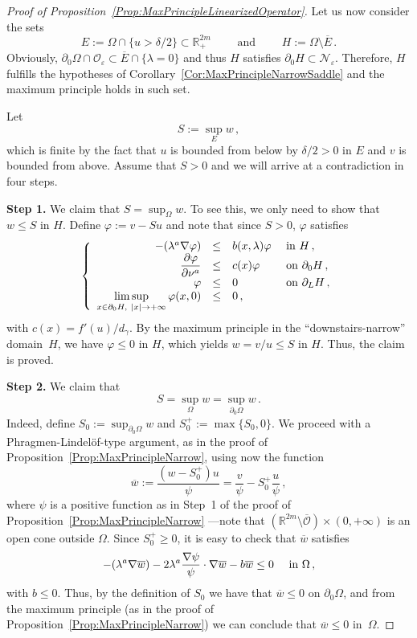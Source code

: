 \documentclass[12pt,reqno]{amsart}
\theoremstyle{definition}
\theoremstyle{remark}
\newcommand{\con}[1]{\mathbb{#1}}
\newcommand{\R}{\con{R}} %
\newcommand{\ocal}{\mathcal{O}}
\newcommand{\s}{\gamma}
\newcommand\beqc[1]{\left\{\begin{array}{#1}}
\newcommand\eeqc{\end{array} \right.}
\def\PDEsystem{rcll}
\let\div\relax
\DeclareMathOperator{\div}{div}
\def\ds{\displaystyle}
\numberwithin{equation}{section}
\begin{document}
\begin{proof}[Proof of Proposition~\ref{Prop:MaxPrincipleLinearizedOperator}]
Let us now consider the sets 
\begin{equation}
\label{Eq:DefOfE&H}
E :=\Omega  \cap \{u > \delta/2\} \subset \R^{2m}_+ \qquad \textrm{ and } \qquad H := \Omega \setminus \overline{E}\,.
\end{equation}
Obviously, $\partial_0 \Omega \cap \ocal_\varepsilon \subset \overline{E} \cap \{\lambda = 0\}$ and thus $H$ satisfies $ \partial_0 H \subset \mathcal{N}_\varepsilon$. Therefore, $H$ fulfills the hypotheses of Corollary~\ref{Cor:MaxPrincipleNarrowSaddle} and the maximum principle holds in such set.


 Let
$$
S := \sup_E w\,,
$$
which is finite by the fact that $u$ is bounded from below  by $\delta/2>0$ in $E$ and $v$ is bounded from above. Assume that $S > 0$ and we will arrive at a contradiction in four steps.

\textbf{Step 1.}
We claim that $S = \sup_\Omega w$. To see this, we only need to show that $w \leq S$ in $H$. Define $\varphi := v -Su$ and note that since $S>0$, $\varphi$ satisfies 
$$
\beqc{\PDEsystem}
-\div(\lambda^a \nabla \varphi) &\leq& b(x,\lambda) \varphi & \text{ in } H \,, \\
\dfrac{\partial \varphi}{\partial \nu^a}  &\leq & c(x) \varphi & \text{ on } \partial_0 H \,, \\
\varphi & \leq & 0 & \text{ on } \partial_L H  \,,\\
\ds \limsup_{x \in \partial_0 H,\ |x|\to +\infty} \varphi(x,0) & \leq & 0\,,
\eeqc
$$
with $c(x) = f'(u) / d_\s$. By the maximum principle in the ``downstairs-narrow'' domain~$H$, we have $\varphi \leq 0$ in $H$, which yields $w = v/u \leq S$ in $H$. Thus, the claim is proved.

\textbf{Step 2.}
We claim that
\begin{equation}
\label{Eq:MaxPrincipleForw}
S = \sup_{\Omega} w = \sup_{\partial_0\Omega} w\,.
\end{equation}
Indeed, define $S_0 := \sup_{\partial_0\Omega} w$ and $S_0^+ := \max \{S_0,0\}$. We proceed with a Phragmen-Lindelöf-type argument, as in the proof of Proposition~\ref{Prop:MaxPrincipleNarrow}, using now the function
$$
\overline{w} := \dfrac{(w - S_0^+)u}{\psi} = \dfrac{v}{\psi} -S_0^+\dfrac{u}{\psi} \,,
$$
where $\psi$ is a positive function as in Step~1 of the proof of Proposition~\ref{Prop:MaxPrincipleNarrow} ---note that $(\R^{2m}\setminus \overline{\ocal})\times (0,+\infty)$ is an open cone outside $\Omega$. Since $S_0^+\geq 0$, it is easy to check that $\overline{w}$ satisfies
$$
-\div(\lambda^a \nabla \overline{w}) - 2 \lambda^a \dfrac{\nabla \psi}{\psi}\cdot \nabla \overline{w} - b \overline{w} \leq 0 \quad \text{ in } \Omega\,,
$$
with $b \leq 0$. Thus, by the definition of $S_0$ we have that $\overline{w}\leq 0$ on $\partial_0 \Omega$, and from the maximum principle (as in the proof of Proposition~\ref{Prop:MaxPrincipleNarrow}) we can conclude that $\overline{w} \leq 0$ in~$\Omega$. 


\end{proof}
\end{document}
